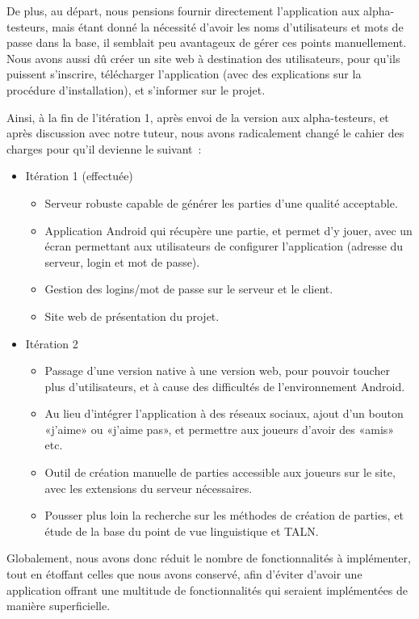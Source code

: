 \documentclass[a4paper,11pt,french]{article}
\def\android{Android\texttrademark{}}
\begin{document}
{De plus, au départ, nous pensions fournir directement l'application aux alpha-testeurs, mais étant donné la nécessité d'avoir les noms d'utilisateurs
et mots de passe dans la base, il semblait peu avantageux de gérer ces points manuellement. Nous avons aussi dû créer un site web à destination
des utilisateurs, pour qu'ils puissent s'inscrire, télécharger l'application (avec des explications sur la procédure d'installation), et
s'informer sur le projet.

Ainsi, à la fin de l'itération 1, après envoi de la version aux alpha-testeurs, et après discussion avec notre tuteur, nous avons
radicalement changé le cahier des charges pour qu'il devienne le suivant~:
\begin{itemize}
\item Itération 1 (effectuée)
  \begin{itemize}
  \item Serveur robuste capable de générer les parties d'une qualité acceptable.
  \item Application \android{} qui récupère une partie, et permet d'y jouer, avec un écran permettant aux utilisateurs de configurer
    l'application (adresse du serveur, login et mot de passe).
  \item Gestion des logins/mot de passe sur le serveur et le client.
  \item Site web de présentation du projet.
  \end{itemize}
\item Itération 2
  \begin{itemize}
  \item Passage d'une version native à une version web, pour pouvoir toucher plus d'utilisateurs, et à cause des difficultés de l'environnement Android.
  \item Au lieu d'intégrer l'application à des réseaux sociaux, ajout d'un bouton «j'aime» ou «j'aime pas», et permettre aux joueurs d'avoir des «amis» etc.
  \item Outil de création manuelle de parties accessible aux joueurs sur le site, avec les extensions du serveur nécessaires.
  \item Pousser plus loin la recherche sur les méthodes de création de parties, et étude de la base du point de vue linguistique et TALN.
  \end{itemize}
\end{itemize}

Globalement, nous avons donc réduit le nombre de fonctionnalités à implémenter, tout en étoffant celles que nous avons conservé, afin
d'éviter d'avoir une application offrant une multitude de fonctionnalités qui seraient implémentées de manière superficielle.

}
\end{document}

